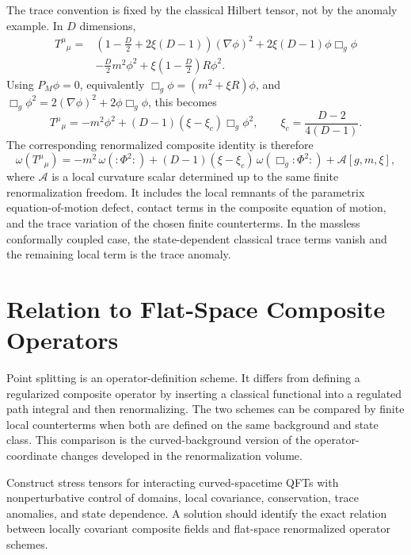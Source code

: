 The trace convention is fixed by the classical Hilbert tensor, not by the
anomaly example.  In \(D\) dimensions,
\begin{equation}
\begin{aligned}
  T^\mu{}_\mu
  ={}&
  \left(1-\frac D2+2\xi(D-1)\right)(\nabla\phi)^2
  +2\xi(D-1)\phi\Box_g\phi \\
  &-\frac D2m^2\phi^2
  +\xi\left(1-\frac D2\right)R\phi^2 .
\end{aligned}
  \label{eq:scalar-hilbert-trace-before-eom}
\end{equation}
Using \(P_M\phi=0\), equivalently
\(\Box_g\phi=(m^2+\xi R)\phi\), and
\(\Box_g\phi^2=2(\nabla\phi)^2+2\phi\Box_g\phi\), this becomes
\begin{equation}
  T^\mu{}_\mu
  =
  -m^2\phi^2
  +(D-1)(\xi-\xi_c)\Box_g\phi^2,
  \qquad
  \xi_c=\frac{D-2}{4(D-1)} .
  \label{eq:scalar-classical-trace-corrected}
\end{equation}
The corresponding renormalized composite identity is therefore
\begin{equation}
  \omega(T^\mu{}_\mu)
  =
  -m^2\,\omega(:\!\Phi^2\!:)
  +(D-1)(\xi-\xi_c)\,
    \omega(\Box_g:\!\Phi^2\!:)
  +\mathcal A[g,m,\xi],
  \label{eq:renormalized-scalar-trace-corrected}
\end{equation}
where \(\mathcal A\) is a local curvature scalar determined up to the same
finite renormalization freedom.  It includes the local remnants of the
parametrix equation-of-motion defect, contact terms in the composite
equation of motion, and the trace variation of the chosen finite
counterterms.  In the massless conformally coupled case, the state-dependent
classical trace terms vanish and the remaining local term is the trace
anomaly.

\section{Relation to Flat-Space Composite Operators}

Point splitting is an operator-definition scheme.  It differs from defining a
regularized composite operator by inserting a classical functional into a
regulated path integral and then renormalizing.  The two schemes can be
compared by finite local counterterms when both are defined on the same
background and state class.  This comparison is the curved-background version
of the operator-coordinate changes developed in the renormalization volume.

\begin{openproblem}
\label{op:interacting-stress-tensors-beyond-formal-perturbation}
Construct stress tensors for interacting curved-spacetime QFTs with
nonperturbative control of domains, local covariance, conservation, trace
anomalies, and state dependence.  A solution should identify the exact
relation between locally covariant composite fields and flat-space
renormalized operator schemes.
\end{openproblem}
